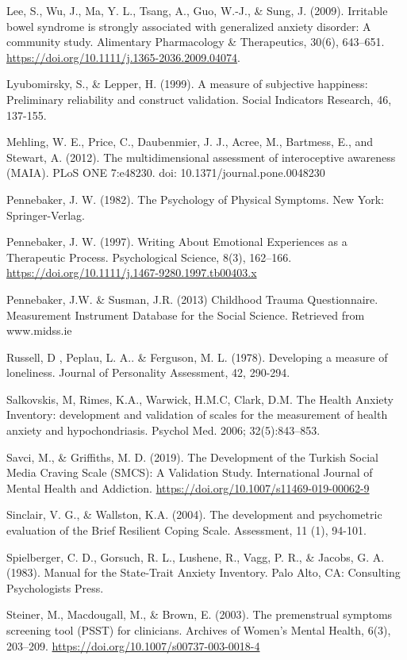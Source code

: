 \documentclass[]{book}
\begin{document}
Lee, S., Wu, J., Ma, Y. L., Tsang, A., Guo, W.-J., \& Sung, J. (2009). Irritable bowel syndrome is strongly associated with generalized anxiety disorder: A community study. Alimentary Pharmacology \& Therapeutics, 30(6), 643--651. \url{https://doi.org/10.1111/j.1365-2036.2009.04074}.

Lyubomirsky, S., \& Lepper, H. (1999). A measure of subjective happiness: Preliminary reliability and construct validation. Social Indicators Research, 46, 137-155.

Mehling, W. E., Price, C., Daubenmier, J. J., Acree, M., Bartmess, E., and Stewart, A. (2012). The multidimensional assessment of interoceptive awareness (MAIA). PLoS ONE 7:e48230. doi: 10.1371/journal.pone.0048230

Pennebaker, J. W. (1982). The Psychology of Physical Symptoms. New York: Springer-Verlag.

Pennebaker, J. W. (1997). Writing About Emotional Experiences as a Therapeutic Process. Psychological Science, 8(3), 162--166. \url{https://doi.org/10.1111/j.1467-9280.1997.tb00403.x}

Pennebaker, J.W. \& Susman, J.R. (2013) Childhood Trauma Questionnaire. Measurement Instrument Database for the Social Science. Retrieved from www.midss.ie

Russell, D , Peplau, L. A.. \& Ferguson, M. L. (1978). Developing a measure of loneliness.
Journal of Personality Assessment, 42, 290-294.

Salkovskis, M, Rimes, K.A., Warwick, H.M.C, Clark, D.M. The Health Anxiety Inventory: development and validation of scales for the measurement of health anxiety and hypochondriasis. Psychol Med. 2006; 32(5):843--853.

Savci, M., \& Griffiths, M. D. (2019). The Development of the Turkish Social Media Craving Scale (SMCS): A Validation Study. International Journal of Mental Health and Addiction. \url{https://doi.org/10.1007/s11469-019-00062-9}

Sinclair, V. G., \& Wallston, K.A. (2004). The development and psychometric evaluation of the Brief Resilient Coping Scale. Assessment, 11 (1), 94-101.

Spielberger, C. D., Gorsuch, R. L., Lushene, R., Vagg, P. R., \& Jacobs, G. A. (1983). Manual for the State-Trait Anxiety Inventory. Palo Alto, CA: Consulting Psychologists Press.

Steiner, M., Macdougall, M., \& Brown, E. (2003). The premenstrual symptoms screening tool (PSST) for clinicians. Archives of Women's Mental Health, 6(3), 203--209. \url{https://doi.org/10.1007/s00737-003-0018-4}
\end{document}
